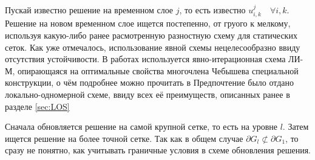 Пускай известно решение на временном слое $j$, то есть известно $u_{i, k}^{j} \quad \forall i, k$.
Решение на новом временном слое ищется постепенно, от груого к мелкому, используя какую-либо ранее расмотренную разностную схему для статических сеток.
Как уже отмечалось, использование явной схемы нецелесообразно ввиду отсутствия устойчивости.
В работах \cite{жуков2015численное} используется явно-итерационная схема ЛИ-М, опирающаяся на оптимальные свойства многочлена Чебышева специальной конструкции, о чём подробнее можно прочитать в \cite{жуков2010явных, жуков2015решении, жуков2014параллельный}
Предпочтение было отдано локально-одномерной схеме, ввиду всех её преимуществ, описанных ранее в разделе \ref{sec:LOS}

Сначала обновляется решение на самой крупной сетке, то есть на уровне $l$.
Затем ищется решение на более точной сетке. 
Так как в общем случае $\partial G_l \not\subset \partial G_1$, то сразу не понятно, как учитывать граничные условия в схеме обновления решения.